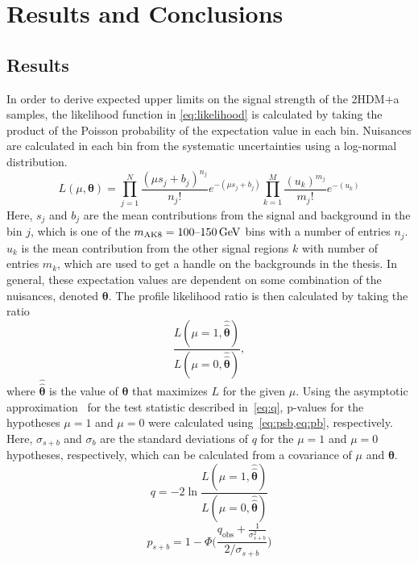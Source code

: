 \chapter{Results and Conclusions}
\section{Results}
In order to derive expected upper limits on the signal strength of the 2HDM+a samples, the likelihood function in \cref{eq:likelihood} is calculated by taking the product of the Poisson probability of the expectation value in each bin. Nuisances are calculated in each bin from the systematic uncertainties using a log-normal distribution.
\begin{equation}
    L(\mu, \boldsymbol{\theta}) = \prod_{j=1}^N\frac{(\mu s_j+b_j)^{n_j}}{n_j!}e^{-(\mu s_j+b_j)}\prod_{k=1}^M\frac{(u_k)^{m_j}}{m_j!}e^{-(u_k)}
    \label{eq:likelihood}
\end{equation}
Here, $s_j$ and $b_j$ are the mean contributions from the signal and background in the bin $j$, which is one of the $m_\text{AK8} = 100\text{--}\GeV{150}$ bins with a number of entries $n_j$. $u_k$ is the mean contribution from the other signal regions $k$ with number of entries $m_k$, which are used to get a handle on the backgrounds in the thesis. In general, these expectation values are dependent on some combination of the nuisances, denoted $\boldsymbol{\theta}$.
The profile likelihood ratio is then calculated by taking the ratio
\begin{equation}
    \frac{L(\mu=1, \boldsymbol{\hat{\hat{\theta}}})}{L(\mu=0, \boldsymbol{\hat{\hat{\theta}}})},
    \label{eq:ratio}
\end{equation}
where $\boldsymbol{\hat{\hat{\theta}}}$ is the value of $\boldsymbol{\theta}$ that maximizes $L$ for the given $\mu$.
Using the asymptotic approximation~\cite{Cowan_2011} for the test statistic described in~\cref{eq:q}, p-values for the hypotheses $\mu=1$ and $\mu=0$ were calculated using~\cref{eq:psb,eq:pb}, respectively. Here, $\sigma_{s+b}$ and $\sigma_{b}$ are the standard deviations of $q$ for the $\mu=1$ and $\mu=0$ hypotheses, respectively, which can be calculated from a covariance of $\mu$ and $\boldsymbol{\theta}$. 
\begin{equation}
    q = -2\ln\frac{L(\mu=1, \boldsymbol{\hat{\hat{\theta}}})}{L(\mu=0, \boldsymbol{\hat{\hat{\theta}}})}
    \label{eq:q}
\end{equation}
\begin{equation}
    p_{s+b} =  1 - \Phi\bigg(\frac{q_\text{obs}+\frac{1}{\sigma^2_{s+b}}}{2/\sigma_{s+b}}\bigg)
    \label{eq:psb}
\end{equation}

